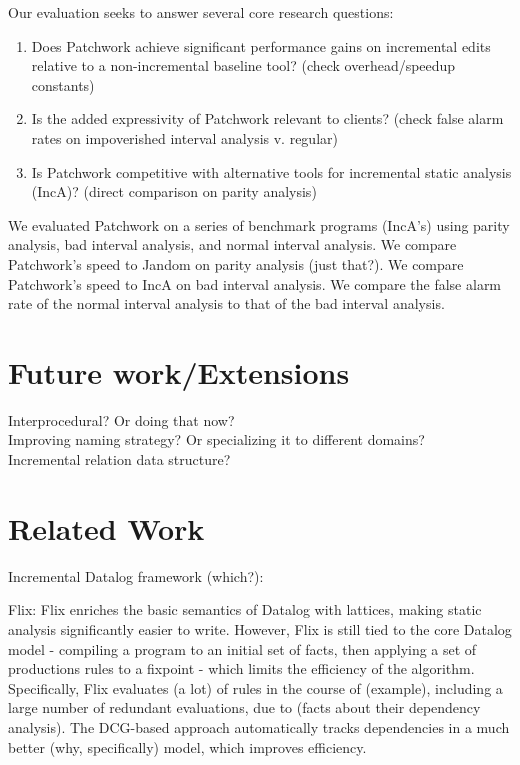 \documentclass[acmlarge,anonymous]{acmart}\settopmatter{printfolios=true}
\begin{document}
Our evaluation seeks to answer several core research questions:

\begin{enumerate}
    \item Does Patchwork achieve significant performance gains on incremental edits relative to a non-incremental baseline tool? (check overhead/speedup constants)
    \item Is the added expressivity of Patchwork relevant to clients? (check false alarm rates on impoverished interval analysis v. regular)
    \item Is Patchwork competitive with alternative tools for incremental static analysis (IncA)? (direct comparison on parity analysis)
\end{enumerate}

We evaluated Patchwork on a series of benchmark programs (IncA's) using parity analysis, bad interval analysis, and normal interval analysis. We compare Patchwork's speed to Jandom on parity analysis (just that?). We compare Patchwork's speed to IncA on bad interval analysis. We compare the false alarm rate of the normal interval analysis to that of the bad interval analysis.

\section{Future work/Extensions}

Interprocedural? Or doing that now?\\
Improving naming strategy? Or specializing it to different domains?\\
Incremental relation data structure?

\section{Related Work}

Incremental Datalog framework (which?):

Flix: Flix enriches the basic semantics of Datalog with lattices, making static analysis significantly easier to write. However, Flix is still tied to the core Datalog model - compiling a program to an initial set of facts, then applying a set of productions rules to a fixpoint - which limits the efficiency of the algorithm. Specifically, Flix evaluates (a lot) of rules in the course of (example), including a large number of redundant evaluations, due to (facts about their dependency analysis). The DCG-based approach automatically tracks dependencies in a much better (why, specifically) model, which improves efficiency.
\end{document}
